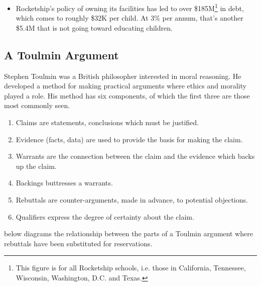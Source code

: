 \begin{enumerate}[topsep=0.3\baselineskip,itemsep=0.25\baselineskip]
\begin{itemize}[topsep=0.125\baselineskip,itemsep=0.25\baselineskip]
      \item Rocketship's policy of owning its facilities has led to over \$185M\footnote{This figure is for all Rocketship schools, i.e. those in  California, Tennessee, Wisconsin, Washington, D.C. and Texas.} in debt, which comes to roughly \$32K per child. At 3\% per annum, that's another \$5.4M that is not going toward educating children.
    \end{itemize}
\end{enumerate}

\subsection{A Toulmin Argument}%
\label{sec:toulmin-arguments}\indent%

Stephen Toulmin was a British philosopher interested in moral reasoning. He developed a method for making practical arguments where ethics and morality played a role. His method has six components, of which the first three are those most commonly seen.
\begin{enumerate}[topsep=0.3\baselineskip,itemsep=0.25\baselineskip]
  \item Claims are statements, conclusions which must be justified.
  \item Evidence (facts, data) are used to provide the basis for making the claim.
  \item Warrants are the connection between the claim and the evidence which backs up the claim.
  \item Backings buttresses a warrants.
  \item Rebuttals are counter-arguments, made in advance, to potential objections.
  \item Qualifiers express the degree of certainty about the claim.
\end{enumerate}

 below diagrams the relationship between the parts of a Toulmin argument where rebuttals have been substituted for reservations.

